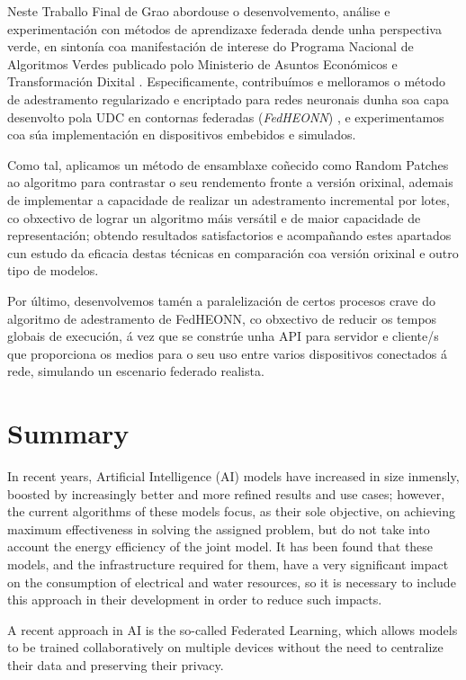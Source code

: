 \documentclass[00-Trabajo_Final.tex]{subfiles}
\begin{document}
Neste Traballo Final de Grao abordouse o desenvolvemento, análise e experimentación con métodos de aprendizaxe federada dende unha perspectiva verde, en sintonía coa manifestación de interese do Programa Nacional de Algoritmos Verdes \cite{libro_PNAV} publicado polo Ministerio de Asuntos Económicos e Transformación Dixital \cite{web_ministerio}. Especificamente, contribuímos e melloramos o método de adestramento regularizado e encriptado para redes neuronais dunha soa capa desenvolto pola UDC en contornas federadas (\textit{FedHEONN}) \cite{paper_FEDHEONN}, e experimentamos coa súa implementación en dispositivos embebidos e simulados.

Como tal, aplicamos un método de ensamblaxe coñecido como Random Patches ao algoritmo para contrastar o seu rendemento fronte a versión orixinal, ademais de implementar a capacidade de realizar un adestramento incremental por lotes, co obxectivo de lograr un algoritmo máis versátil e de maior capacidade de representación; obtendo resultados satisfactorios e acompañando estes apartados cun estudo da eficacia destas técnicas en comparación coa versión orixinal e outro tipo de modelos.

Por último, desenvolvemos tamén a paralelización de certos procesos crave do algoritmo de adestramento de FedHEONN, co obxectivo de reducir os tempos globais de execución, á vez que se constrúe unha API para servidor e cliente/s que proporciona os medios para o seu uso entre varios dispositivos conectados á rede, simulando un escenario federado realista.

\newpage
\section{Summary}

In recent years, Artificial Intelligence (AI) models have increased in size inmensly, boosted by increasingly better and more refined results and use cases; however, the current algorithms of these models focus, as their sole objective, on achieving maximum effectiveness in solving the assigned problem, but do not take into account the energy efficiency of the joint model. It has been found that these models, and the infrastructure required for them, have a very significant impact on the consumption of electrical and water resources, so it is necessary to include this approach in their development in order to reduce such impacts.

A recent approach in AI is the so-called Federated Learning, which allows models to be trained collaboratively on multiple devices without the need to centralize their data and preserving their privacy.
\end{document}
